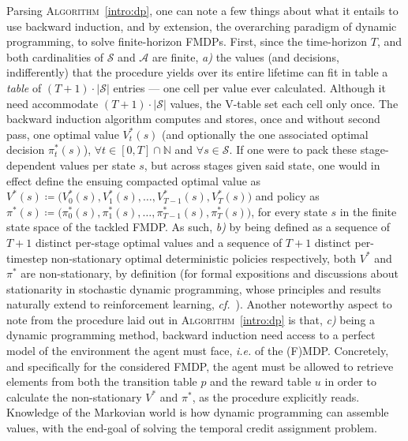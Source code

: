 Parsing \textsc{Algorithm}~\ref{intro:dp}, one can note a few things about what it entails
to use backward induction,
and by extension, the overarching paradigm of dynamic programming, to solve finite-horizon FMDPs.
First, since the time-horizon $T$, and both cardinalities of $\mathcal{S}$ and $\mathcal{A}$ are finite,
\textit{a)} the values (and decisions, indifferently) that the procedure yields over its entire lifetime can fit
in table a \emph{table} of $(T + 1) \cdot |\mathcal{S}|$ entries --- one cell per value ever calculated.
Although it need accommodate $(T + 1) \cdot |\mathcal{S}|$ values, the V-table
set each cell only once.
The backward induction algorithm computes and stores, once and without second pass,
one optimal value $V_t^*(s)$ (and optionally the one associated optimal decision $\pi_t^*(s)$),
$\forall t \in [0, T] \cap \mathbb{N}$ and $\forall s \in \mathcal{S}$.
If one were to pack these stage-dependent values per state $s$, but across stages given said state,
one would in effect define the ensuing compacted optimal value as
$V^*(s) \coloneqq \big(V_0^*(s), V_1^*(s), \ldots, V_{T-1}^*(s), V_T^*(s)\big)$ and policy as
$\pi^*(s)  \coloneqq \big(\pi_0^*(s), \pi_1^*(s), \ldots, \pi_{T-1}^*(s), \pi_T^*(s)\big)$,
for every state $s$ in the finite state space of the tackled FMDP.
As such, \textit{b)} by being defined as a sequence of $T+1$ distinct per-stage optimal values
and a sequence of $T+1$ distinct per-timestep non-stationary optimal deterministic policies respectively,
both $V^*$ and $\pi^*$ are non-stationary, by definition (for formal expositions and discussions
about stationarity in stochastic dynamic programming, whose principles and results naturally
extend to reinforcement learning, \textit{cf.}~\cite{Ross1983-oc}).
Another noteworthy aspect to note from the procedure laid out in \textsc{Algorithm}~\ref{intro:dp}
is that, \textit{c)} being a dynamic programming method,
backward induction need access to a perfect model of the environment the agent must face,
\textit{i.e.} of the (F)MDP.
Concretely, and specifically for the considered FMDP,
the agent must be allowed to retrieve elements from both
the transition table $p$ and the reward table $u$
in order to calculate the non-stationary $V^*$ and $\pi^*$, as the procedure explicitly reads.
Knowledge of the Markovian world is how dynamic programming can assemble values,
with the end-goal of solving the temporal credit assignment problem.

